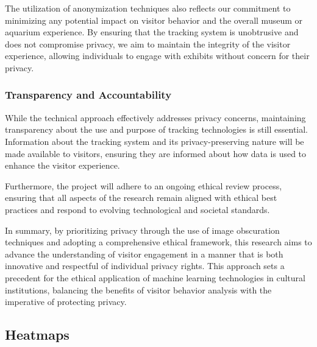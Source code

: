 The utilization of anonymization techniques also reflects our commitment to minimizing any potential impact on visitor behavior and the overall museum or aquarium experience. By ensuring that the tracking system is unobtrusive and does not compromise privacy, we aim to maintain the integrity of the visitor experience, allowing individuals to engage with exhibits without concern for their privacy.

\subsubsection{Transparency and Accountability}
While the technical approach effectively addresses privacy concerns, maintaining transparency about the use and purpose of tracking technologies is still essential. Information about the tracking system and its privacy-preserving nature will be made available to visitors, ensuring they are informed about how data is used to enhance the visitor experience.

Furthermore, the project will adhere to an ongoing ethical review process, ensuring that all aspects of the research remain aligned with ethical best practices and respond to evolving technological and societal standards.

In summary, by prioritizing privacy through the use of image obscuration techniques and adopting a comprehensive ethical framework, this research aims to advance the understanding of visitor engagement in a manner that is both innovative and respectful of individual privacy rights. This approach sets a precedent for the ethical application of machine learning technologies in cultural institutions, balancing the benefits of visitor behavior analysis with the imperative of protecting privacy.


\subsection{Heatmaps}
\label{sec:heatmaps}

